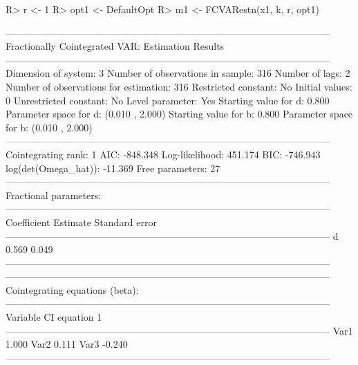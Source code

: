 \documentclass[article]{jss}
\begin{document}
\begin{CodeChunk} 
\begin{CodeInput}
R> r <- 1
R> opt1 <- DefaultOpt
R> m1 <- FCVARestn(x1, k, r, opt1)
\end{CodeInput}
\begin{CodeOutput}
-----------------------------------------------------------------------------------------------------
                      Fractionally Cointegrated VAR: Estimation Results                              
-----------------------------------------------------------------------------------------------------
Dimension of system:       3      Number of observations in sample:          316 
Number of lags:            2      Number of observations for estimation:     316 
Restricted constant:      No      Initial values:                              0
Unrestricted constant:    No      Level parameter:                           Yes
Starting value for d:    0.800    Parameter space for d: (0.010 , 2.000) 
Starting value for b:    0.800    Parameter space for b: (0.010 , 2.000) 
-----------------------------------------------------------------------------------------------------
Cointegrating rank:            1  AIC:              -848.348 
Log-likelihood:          451.174  BIC:              -746.943 
log(det(Omega_hat)):     -11.369  Free parameters:        27 
-----------------------------------------------------------------------------------------------------
    Fractional parameters:                                                                             
-----------------------------------------------------------------------------------------------------
    Coefficient              	 Estimate              	  Standard error 
-----------------------------------------------------------------------------------------------------
         d                   	    0.569              	        0.049                
-----------------------------------------------------------------------------------------------------
-----------------------------------------------------------------------------------------------------
    Cointegrating equations (beta):                                                                  
-----------------------------------------------------------------------------------------------------
      Variable        CI equation 1  
-----------------------------------------------------------------------------------------------------
        Var1              1.000     
        Var2              0.111     
        Var3             -0.240     
-----------------------------------------------------------------------------------------------------

\end{CodeOutput}
\end{CodeChunk}
\end{document}
